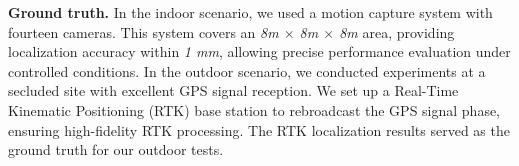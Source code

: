 \textbf{Ground truth.}
In the indoor scenario, we used a motion capture system with fourteen cameras. 
This system covers an \textit{8m $\times$ 8m $\times$ 8m} area, providing localization accuracy within \textit{1 mm}, allowing precise performance evaluation under controlled conditions.
In the outdoor scenario,  we conducted experiments at a secluded site with excellent GPS signal reception. We set up a Real-Time Kinematic Positioning (RTK) base station to rebroadcast the GPS signal phase, ensuring high-fidelity RTK processing. The RTK localization results served as the ground truth for our outdoor tests.
% 


